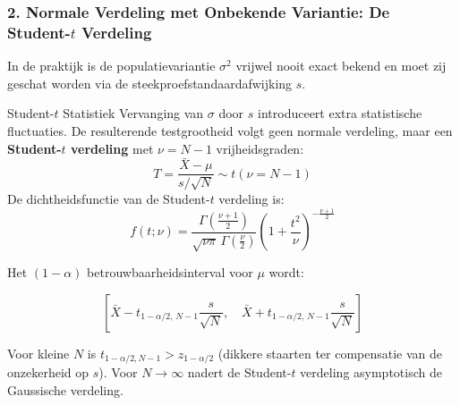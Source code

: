 \documentclass[11pt,a4paper]{article}
\begin{document}
\subsubsection{2. Normale Verdeling met Onbekende Variantie: De Student-\texorpdfstring{$t$}{t} Verdeling}
In de praktijk is de populatievariantie $\sigma^2$ vrijwel nooit exact bekend en moet zij geschat worden via de steekproefstandaardafwijking $s$.

\begin{theobox}{Student-$t$ Statistiek}
Vervanging van $\sigma$ door $s$ introduceert extra statistische fluctuaties. De resulterende testgrootheid volgt geen normale verdeling, maar een \textbf{Student-$t$ verdeling} met $\nu = N - 1$ vrijheidsgraden:
\begin{equation}
    T = \frac{\bar{X} - \mu}{s / \sqrt{N}} \sim t(\nu = N - 1)
\end{equation}
De dichtheidsfunctie van de Student-$t$ verdeling is:
\begin{equation}
    f(t; \nu) = \frac{\Gamma\left(\frac{\nu + 1}{2}\right)}{\sqrt{\nu\pi} \, \Gamma\left(\frac{\nu}{2}\right)} \left( 1 + \frac{t^2}{\nu} \right)^{-\frac{\nu + 1}{2}}
\end{equation}
\end{theobox}
Het $(1 - \alpha)$ betrouwbaarheidsinterval voor $\mu$ wordt:
\begin{formulabox}
\begin{equation}
    \left[ \bar{X} - t_{1 - \alpha/2, \, N - 1} \frac{s}{\sqrt{N}}, \quad \bar{X} + t_{1 - \alpha/2, \, N - 1} \frac{s}{\sqrt{N}} \right]
\end{equation}
\end{formulabox}
Voor kleine $N$ is $t_{1 - \alpha/2, N-1} > z_{1 - \alpha/2}$ (dikkere staarten ter compensatie van de onzekerheid op $s$). Voor $N \to \infty$ nadert de Student-$t$ verdeling asymptotisch de Gaussische verdeling.
\end{document}
